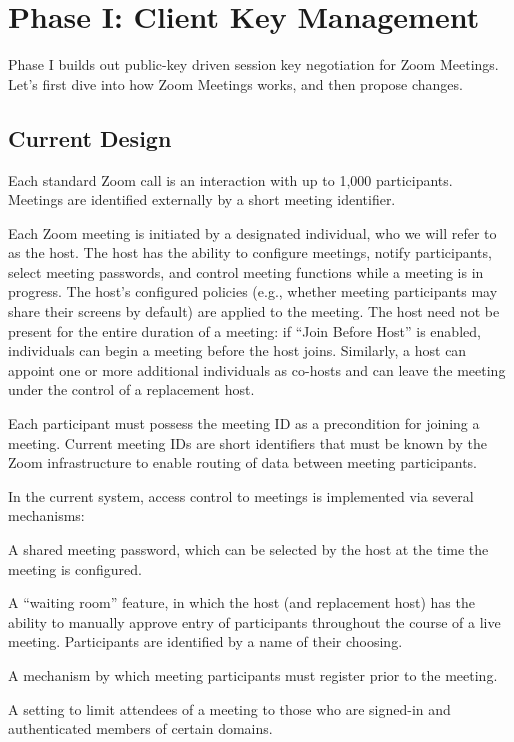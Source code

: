 \section{Phase I: Client Key Management}
Phase I builds out public-key driven session key negotiation for Zoom Meetings. Let's first dive into how Zoom Meetings works, and then propose changes.
\subsection{Current Design}

Each standard Zoom call is an interaction with up to 1,000 participants. Meetings are identified externally by a short meeting identifier.

Each Zoom meeting is initiated by a designated individual, who we will refer to as the host. The host has the ability to configure meetings, notify participants, select meeting passwords, and control meeting functions while a meeting is in progress. The host's configured policies (e.g., whether meeting participants may share their screens by default) are applied to the meeting. The host need not be present for the entire duration of a meeting: if ``Join Before Host'' is enabled, individuals can begin a meeting before the host joins. Similarly, a host can appoint one or more additional individuals as co-hosts and can leave the meeting under the control of a replacement host.

Each participant must possess the meeting ID as a precondition for joining a meeting. Current meeting IDs are short identifiers that must be known by the Zoom infrastructure to enable routing of data between meeting participants.

In the current system, access control to meetings is implemented via several mechanisms:

\begin{itemize*}
\item A shared meeting password, which can be selected by the host at the time the meeting is configured.
\item A ``waiting room'' feature, in which the host (and replacement host) has the ability to manually approve entry of participants throughout the course of a live meeting. Participants are identified by a name of their choosing.
\item A mechanism by which meeting participants must register prior to the meeting.
\item A setting to limit attendees of a meeting to those who are signed-in and authenticated members of certain domains.
\end{itemize*}

